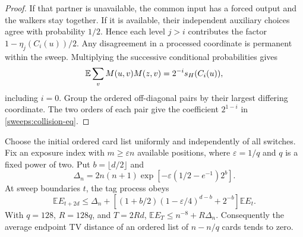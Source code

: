 \begin{proof}
If that partner is unavailable, the common input has a forced output
and the walkers stay together. If it is available, their independent
auxiliary choices agree with probability $1/2$. Hence each level
$j>i$ contributes the factor $1-\eta_j(C_i(u))/2$. Any disagreement
in a processed coordinate is permanent within the sweep. Multiplying
the successive conditional probabilities gives
\[
 \mathbb E\sum_vM(u,v)M(z,v)=2^{-i}s_H(C_i(u)),
\]
including $i=0$. Group the ordered off-diagonal pairs by their largest
differing coordinate. The two orders of each pair give the coefficient
$2^{1-i}$ in \eqref{sweeps:collision-eq}.
\end{proof}

\begin{proposition}\label{sweeps:averaged}
Choose the initial ordered card list uniformly and independently of all
switches.  Fix an exposure index with $m\ge\varepsilon n$ available positions, where
$\varepsilon=1/q$ and $q$ is a fixed power of two.  Put
$b=\lfloor d/2\rfloor$ and
\[
 \Delta_n=2n(n+1)\exp[-\varepsilon(1/2-e^{-1})2^b].
\]
At sweep boundaries $t$, the tag process obeys
\begin{equation}\label{sweeps:averaged-recursion}
 \mathbb E E_{t+2d}\le\Delta_n+
 \left[(1+b/2)(1-\varepsilon/4)^{d-b}+2^{-b}\right]\mathbb E E_t.
\end{equation}
With $q=128$, $R=128q$, and $T=2Rd$,
$\mathbb E E_T\le n^{-8}+R\Delta_n$.  Consequently the average endpoint
TV distance of an ordered list of $n-n/q$ cards tends to zero.
\end{proposition}
